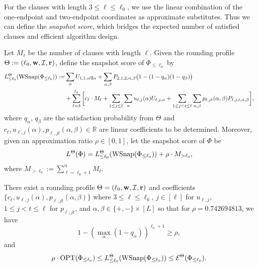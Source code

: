 For the clauses with length  $3\le \ell\le \ell_0$, we use the linear combination of the one-endpoint and two-endpoint coordinates as approximate substitutes. Thus we can define the \textit{snapshot score}, which bridges the expected number of satisfied clauses and efficient algorithm design.

\begin{definition}
\label{def:snapshot-score}
Let $M_{\ell}$ be  the number of clauses with length $\ell$. 
Given the rounding profile  $\Theta:= (\ell_0,\mathbf{w},\mathcal{I},\mathbf{r})$, define the snapshot score of  $\Phi_{\le \ell_0}$ by  
    \[
\begin{aligned}
  L_{\le\ell_0}^\Theta(\operatorname{WSnap}(\Phi_{\le\ell_0}))
  := &\sum_\alpha U_{1,1,\alpha}q_\alpha
    +\sum_{\alpha,\beta}P_{2,1,2,\alpha,\beta}
      \bigl(1-(1-q_\alpha)(1-q_\beta)\bigr)\\
  &+\sum_{\ell=3}^{\ell_0} \bigg[   c_{\ell}\cdot M_{\ell} +\sum_{1\le j\le \ell} \sum_\alpha u_{\ell,j}(\alpha)U_{\ell,j,\alpha}
    +\sum_{1\le j<t\le\ell} \sum_{\alpha,\beta}
      p_{\ell,jt}(\alpha,\beta)P_{\ell,j,t,\alpha,\beta} \bigg],
\end{aligned}
\]
where $q_{\alpha}$,  $q_{\beta}$ are the satisfaction probability from $\Theta$ and  $c_{\ell},u_{\ell,j}(\alpha), p_{\ell,jt}(\alpha,\beta )\in \mathbb{R}$ are linear   coefficients to be determined. 
Moreover, given an approximation ratio $\rho\in [0,1]$, let the snapshot  score of $\Phi$ be 
\[
L^\Theta(\Phi )  = L_{\le\ell_0}^\Theta(\operatorname{WSnap}(\Phi_{\le\ell_0})) + \rho\cdot M_{> \ell_0},
\]
where $M_{> \ell_0} := \sum_{\ell=\ell_0 +1}^{n} M_{\ell}$.
\end{definition}


\begin{lemma}
\label{lem:maxksat-weighted-snapshot-bound}
 There exist  a rounding profile $\Theta= (\ell_0,\mathbf{w},\mathcal{I},\mathbf{r})$ and coefficients $ \{c_{\ell
 }, u_{\ell,j}(\alpha), p_{\ell,jt}(\alpha,\beta) \}$ where $3\le \ell\le \ell_0$, $j\in[\ell]$ for $u_{\ell,j}$, $1\le j<t\le\ell$ for $p_{\ell,jt}$, and $\alpha,\beta\in \{+,-\}\times [L]$ so that  for $\rho = 0.742694813$,  we have
  \begin{equation}
  1-\left(\max_{\alpha}(1-q_\alpha)\right)^{\ell_0+1}\ge\rho
  \label{eq:snapshot-long-clause-bound},
 \end{equation}
 and
 \[
 \rho\cdot \operatorname{OPT}(\Phi_{\le \ell_0})\le  L_{\le\ell_0}^\Theta(\operatorname{WSnap}(\Phi_{\le\ell_0})) \le \mathcal{E}^{\Theta}(\Phi_{\le\ell_0}).
 \]
\end{lemma}

